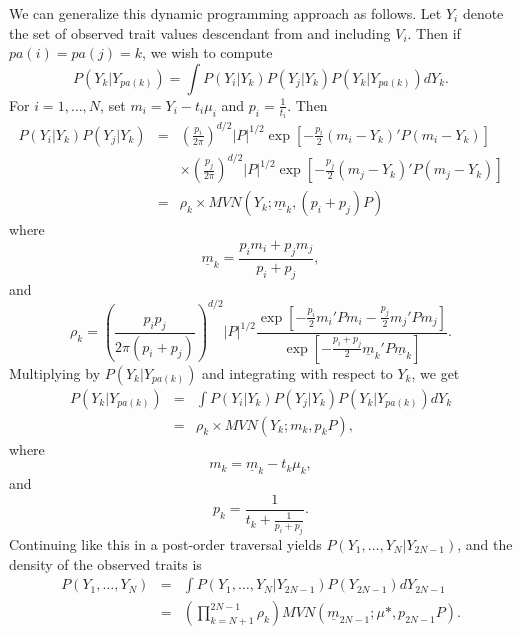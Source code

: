 \documentclass[12pt]{article}
\begin{document}
\par
We can generalize this dynamic programming approach as follows.  Let ${Y_i}$ denote the set of observed trait values descendant from and including
$V_i$.  Then if $pa(i) = pa(j) = k$, we wish to compute
\begin{equation}
P( {Y_k} | Y_{pa(k)} ) = \int P({Y_i} | Y_k) P({Y_j} | Y_k) P(Y_k | Y_{pa(k)}) dY_k .
\end{equation}
For $i = 1, \dots , N$, set $m_i = Y_i - t_i \mu_i $ and $p_i = \frac{1}{t_i}$.  Then
\begin{eqnarray}
P({Y_i} | Y_k) P({Y_j} | Y_k) & = & \left( \frac{p_i}{2 \pi} \right) ^{d/2} |P|^{1/2} 
\exp \left[ -\frac{p_i}{2}(m_i - Y_k)' P (m_i - Y_k)    \right]  \\
& & \times  \left( \frac{p_j}{2 \pi} \right) ^{d/2} |P|^{1/2} \exp \left[ -\frac{p_j}{2}(m_j - Y_k)' P (m_j - Y_k)    \right] \\
& = & \rho_k \times MVN(Y_k; \underline{m}_k, (p_i + p_j) P)
\end{eqnarray}
where 
\begin{equation}
\underline{m}_k = \frac{p_i m_i + p_j m_j}{p_i + p_j} ,
\end{equation}
and
\begin{equation}
\rho_k =  \left( \frac{p_i p_j}{2 \pi (p_i + p_j)} \right)^{d/2}  |P|^{1/2} \frac {\exp \left[ -\frac{p_i}{2} m_i' P m_i -\frac{p_j}{2}m_j'P m_j  \right] }
{ \exp \left[ -\frac{p_i + p_j}{2} \underline{m}_k' P \underline{m}_k \right] } .
\end{equation}
Multiplying by $P(Y_k | Y_{pa(k)})$ and integrating with respect to $Y_k$, we get 
\begin{eqnarray}
P( {Y_k} | Y_{pa(k)} ) & = & \int P({Y_i} | Y_k) P({Y_j} | Y_k) P(Y_k | Y_{pa(k)}) dY_k \\
& = & \rho_k \times MVN(Y_k; m_k, p_k P),
\end{eqnarray}
where
\begin{equation}
m_k = \underline{m}_k - t_k \mu_k ,
\end{equation}
and 
\begin{equation}
p_k = \frac{1}{ t_k + \frac{1}{p_i + p_j} } .
\end{equation}
Continuing like this in a post-order traversal yields $P(Y_1,\dots,Y_N | Y_{2N-1})$, and the density of
the observed traits is
\begin{eqnarray}
P(Y_1,\dots,Y_N) & = & \int P(Y_1,\dots,Y_N | Y_{2N-1}) P(Y_{2N-1}) dY_{2N-1} \\
& = & \left( \prod_{k=N+1}^{2N-1} \rho_k \right) MVN(\underline{m}_{2N-1};\mu*, p_{2N-1} P) .
\end{eqnarray}
\end{document}
